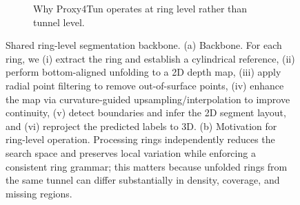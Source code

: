 \documentclass[a4paper,fleqn]{cas-dc}
\begin{document}
{\begin{figure}[t]
\begin{subfigure}{0.98\textwidth}
{\begin{tikzpicture}
\end{tikzpicture}%
}
\caption{Why Proxy4Tun operates at ring level rather than tunnel level.}
\end{subfigure}

\caption{
Shared ring-level segmentation backbone.
(a) Backbone. For each ring, we (i) extract the ring and establish a cylindrical reference, (ii) perform bottom-aligned unfolding to a 2D depth map, (iii) apply radial point filtering to remove out-of-surface points, (iv) enhance the map via curvature-guided upsampling/interpolation to improve continuity, (v) detect boundaries and infer the 2D segment layout, and (vi) reproject the predicted labels to 3D.
(b) Motivation for ring-level operation. Processing rings independently reduces the search space and preserves local variation while enforcing a consistent ring grammar; this matters because unfolded rings from the same tunnel can differ substantially in density, coverage, and missing regions.
}
\label{fig:ring_level_formulation_backbone}
\end{figure}


}
\end{document}
